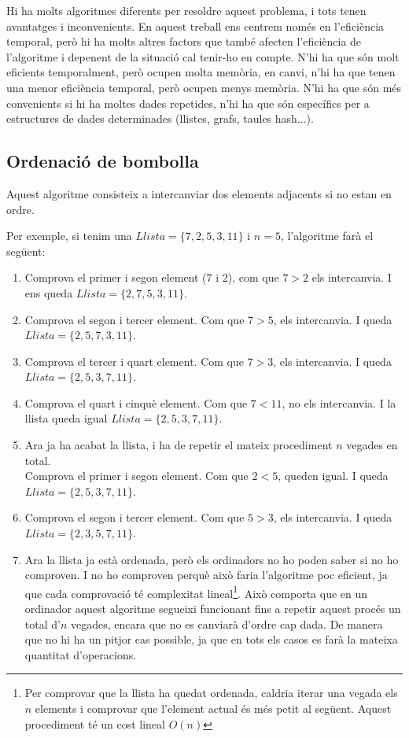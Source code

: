 Hi ha molts algoritmes diferents per resoldre aquest problema, i tots tenen avantatges i inconvenients. En aquest treball ens centrem només en l'eficiència temporal, però hi ha molts altres factors que també afecten l'eficiència de l'algoritme i depenent de la situació cal tenir-ho en compte. N'hi ha que són molt eficients temporalment, però ocupen molta memòria, en canvi, n'hi ha que tenen una menor eficiència temporal, però ocupen menys memòria. N'hi ha que són més convenients si hi ha moltes dades repetides, n'hi ha que són específics per a estructures de dades determinades (llistes, grafs, taules hash...).

\subsection{Ordenació de bombolla}
Aquest algoritme consisteix a intercanviar dos elements adjacents si no estan en ordre.

Per exemple, si tenim una $Llista = \lbrace7, 2, 5, 3, 11\rbrace$ i $n = 5$, l'algoritme farà el següent:

\begin{enumerate}
    \item Comprova el primer i segon element (7 i 2), com que $7 > 2$ els intercanvia. I ens queda $Llista = \lbrace2, 7, 5, 3, 11\rbrace$.
    \item Comprova el segon i tercer element. Com que $7 > 5$, els intercanvia. I queda $Llista = \lbrace2, 5, 7, 3, 11\rbrace$.
    \item Comprova el tercer i quart element. Com que $7 > 3$, els intercanvia. I queda $Llista = \lbrace2, 5, 3, 7, 11\rbrace$.
    \item Comprova el quart i cinquè element. Com que $7 < 11$, no els intercanvia. I la llista queda igual $Llista = \lbrace2, 5, 3, 7, 11\rbrace$.
    \item Ara ja ha acabat la llista, i ha de repetir el mateix procediment $n$ vegades en total. \\ Comprova el primer i segon element. Com que $2 < 5$, queden igual. I queda $Llista = \lbrace2, 5, 3, 7, 11\rbrace$.
    \item Comprova el segon i tercer element. Com que $5 > 3$, els intercanvia. I queda $Llista = \lbrace2, 3, 5, 7, 11\rbrace$.
    \item Ara la llista ja està ordenada, però els ordinadors no ho poden saber si no ho comproven. I no ho comproven perquè això faria l'algoritme poc eficient, ja que cada comprovació té complexitat lineal\footnote{Per comprovar que la llista ha quedat ordenada, caldria iterar una vegada els $n$ elements i comprovar que l'element actual és més petit al següent. Aquest procediment té un cost lineal $O(n)$}. Això comporta que en un ordinador aquest algoritme segueixi funcionant fins a repetir aquest procés un total d'$n$ vegades, encara que no es canviarà d'ordre cap dada. De manera que no hi ha un pitjor cas possible, ja que en tots els casos es farà la mateixa quantitat d'operacions.
\end{enumerate}

